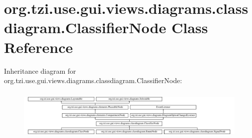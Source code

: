 \hypertarget{classorg_1_1tzi_1_1use_1_1gui_1_1views_1_1diagrams_1_1classdiagram_1_1_classifier_node}{\section{org.\-tzi.\-use.\-gui.\-views.\-diagrams.\-classdiagram.\-Classifier\-Node Class Reference}
\label{classorg_1_1tzi_1_1use_1_1gui_1_1views_1_1diagrams_1_1classdiagram_1_1_classifier_node}
}
Inheritance diagram for org.\-tzi.\-use.\-gui.\-views.\-diagrams.\-classdiagram.\-Classifier\-Node\-:\begin{figure}[H]
\begin{center}
\leavevmode
\includegraphics[height=2.488889cm]{classorg_1_1tzi_1_1use_1_1gui_1_1views_1_1diagrams_1_1classdiagram_1_1_classifier_node}
\end{center}
\end{figure}
